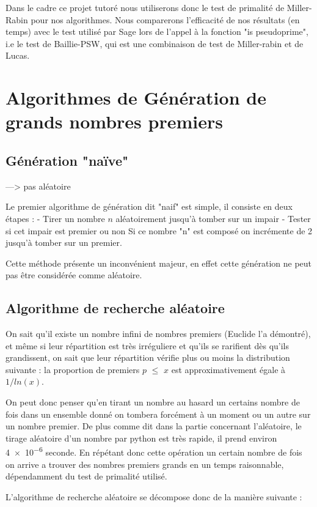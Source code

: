 \documentclass[a4paper,11pt]{article}
\begin{document}
Dans le cadre ce projet tutoré nous utiliserons donc le test de primalité de Miller-Rabin pour nos algorithmes. Nous comparerons l'efficacité de nos résultats (en temps) avec le test utilisé par Sage lors de l'appel à la fonction "is pseudoprime", i.e le test de Baillie-PSW, qui est une combinaison de test de Miller-rabin et de Lucas.


\section{Algorithmes de Génération de grands nombres premiers}

\subsection{Génération "naïve"}

---> pas aléatoire 

Le premier algorithme de génération dit "naif" est simple, il consiste en deux étapes :
    - Tirer un nombre $n$ aléatoirement jusqu'à tomber sur un impair
    - Tester si cet impair est premier ou non
        Si ce nombre "n" est composé on incrémente de 2 jusqu'à tomber sur un premier.
    
Cette méthode présente un inconvénient majeur, en effet cette génération ne peut pas être considérée comme aléatoire. 
\subsection{Algorithme de recherche aléatoire }
On sait qu'il existe un nombre infini de nombres premiers (Euclide l'a démontré),  et même si leur répartition est très irréguliere et qu'ils se rarifient dès qu'ils grandissent, on sait que leur répartition vérifie plus ou moins la distribution suivante :
la proportion de premiers $p$ $\leq$ $x$ est approximativement égale à $1/ln(x)$.

On peut donc penser qu'en tirant un nombre au hasard un certains nombre de fois dans un ensemble donné on tombera forcément à un moment ou un autre sur un nombre premier.
De plus comme dit dans la partie concernant l'aléatoire, le tirage aléatoire d'un nombre par python est très rapide, il prend environ  \num{4e-6} seconde. En répétant donc cette opération un certain nombre de fois on arrive a trouver des nombres premiers grands en un temps raisonnable, dépendamment du test de primalité utilisé. 

L'algorithme de recherche aléatoire se décompose donc de la manière suivante : 
\end{document}
